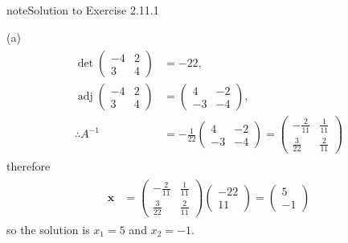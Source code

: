 \documentclass[letterpaper,10pt,english]{jupyterBook}
\begin{document}
\begin{sphinxadmonition}{note}{Solution to Exercise 2.11.1}



\sphinxAtStartPar
(a)
\begin{equation*}
\begin{split} \begin{align*}
    \det\left(\begin{matrix}-4 & 2\\3 & 4\end{matrix}\right) &= -22, \\ 
    \operatorname{adj}\left(\begin{matrix}-4 & 2\\3 & 4\end{matrix}\right) &= \left(\begin{matrix}4 & -2\\-3 & -4\end{matrix}\right), \\ 
    \therefore A^{-1} &= - \frac{1}{22}\left(\begin{matrix}4 & -2\\-3 & -4\end{matrix}\right) = \left(\begin{matrix}- \frac{2}{11} & \frac{1}{11}\\\frac{3}{22} & \frac{2}{11}\end{matrix}\right) 
\end{align*} \end{split}
\end{equation*}
\sphinxAtStartPar
therefore
\begin{equation*}
\begin{split}\begin{align*}
    \mathbf{x} &= \left(\begin{matrix}- \frac{2}{11} & \frac{1}{11}\\\frac{3}{22} & \frac{2}{11}\end{matrix}\right)
    \left(\begin{matrix}-22\\11\end{matrix}\right) = 
    \left(\begin{matrix}5\\-1\end{matrix}\right)
\end{align*} \end{split}
\end{equation*}
\sphinxAtStartPar
so the solution is \(x_1 = 5\) and \(x_2 = -1\).


\end{sphinxadmonition}
\end{document}

